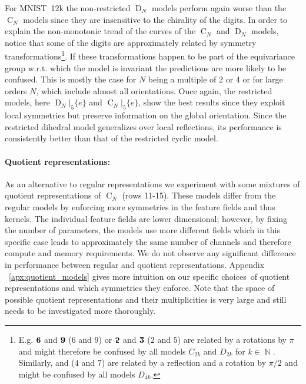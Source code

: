 \documentclass{article}
\newcommand{\apx}{Appendix\xspace
}
\DeclareMathOperator*{\N}{\mathbb{N}}
\newcommand{\DN}{\ensuremath{\operatorname{D}_{\!N}}}
\newcommand{\CN}{\ensuremath{\operatorname{C}_{\!N}}}
\begin{document}
For MNIST~12k the non-restricted $\DN$ models perform again worse than the $\CN$ models since they are insensitive to the chirality of the digits.
In order to explain the non-monotonic trend of the curves of the $\CN$ and $\DN$ models, notice that some of the digits are approximately related by symmetry transformations\footnote{
    E.g.
    $\mathbin{\rotatebox[origin=c]{180}{$\mathbf{9}$}}$
    and
    $\mathbin{\rotatebox[origin=c]{180}{$\mathbf{6}$}}$
    ($6$ and $9$)
    or
    $\mathbin{\rotatebox[origin=c]{180}{\reflectbox{$\mathbf{5}$}}}$
    and
    $\mathbin{\rotatebox[origin=c]{180}{\reflectbox{$\mathbf{2}$}}}$
    ($2$ and $5$)
    are related by a rotations by $\pi$ and might therefore be confused by all models $C_{2k}$ and $D_{2k}$ for $k\in\N$.
    Similarly,
    and
    ($4$ and $7$)
    are related by a reflection and a rotation by $\pi/2$ and might be confused by all models $D_{4k}$.
}.
If these transformations happen to be part of the equivariance group w.r.t. which the model is invariant the predictions are more likely to be confused.
This is mostly the case for $N$ being a multiple of 2 or 4 or for large orders $N$, which include almost all orientations.
Once again, the restricted models, here $\DN\!|_5\{e\}$ and $\CN\!|_5\{e\}$, show the best results since they exploit local symmetries but preserve information on the global orientation.
Since the restricted dihedral model generalizes over local reflections, its performance is consistently better than that of the restricted cyclic model.



\paragraph{Quotient representations:}
As an alternative to regular representations we experiment with some mixtures of quotient representations of $\CN$ (rows 11-15).
These models differ from the regular models by enforcing more symmetries in the feature fields and thus kernels.
The individual feature fields are lower dimensional; however, by fixing the number of parameters, the models use more different fields which in this specific case leads to approximately the same number of channels and therefore compute and memory requirements.
We do not observe any significant difference in performance between regular and quotient representations.
\apx~\ref{apx:quotient_models} gives more intuition on our specific choices~of quotient representations and which symmetries they enforce.
Note that the space of possible quotient representations and their multiplicities is very large and still needs to be investigated more thoroughly.
\end{document}
